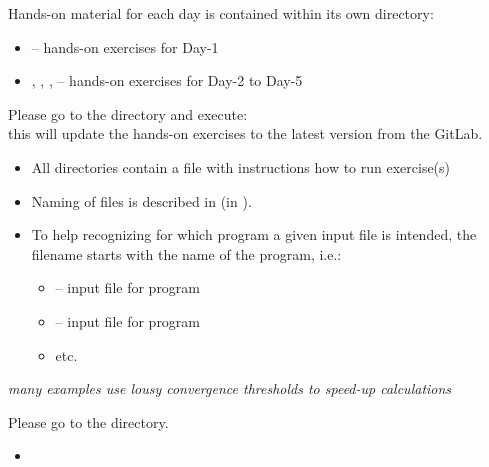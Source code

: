 \documentclass[landscape]{foils}
\def\red{\color{red}}
\begin{document}

Hands-on material for each day is contained within its own directory:
\vspace{-0.5em}
\begin{itemize}
\item {} -- hands-on exercises for Day-1
  \vspace{-0.5em}
\item {}, , ,  -- hands-on
  exercises for Day-2 to Day-5
\end{itemize}

Please go to the  directory and execute: ~\\
this will update the hands-on exercises to the latest version from the
GitLab.
\begin{itemize}
\item All directories contain a  file with instructions
  how to run exercise(s)
\vspace{-0.5em}
\item Naming of files is described in  (in
  ).
\vspace{-0.5em}
\item To help recognizing for which program a given input file is
  intended, the filename starts with the name of the program, i.e.:
  \vspace{-0.5em}
\begin{itemize}
\item {} -- input file for  program
\item {} -- input file for  program
\item etc.
\end{itemize}
\end{itemize}

{\red {\bf Disclaimer:} {\em many examples use lousy convergence
    thresholds to speed-up calculations}}

%
Please go to the  directory.
\begin{itemize}
\item {}  
\end{itemize}
\end{document}
